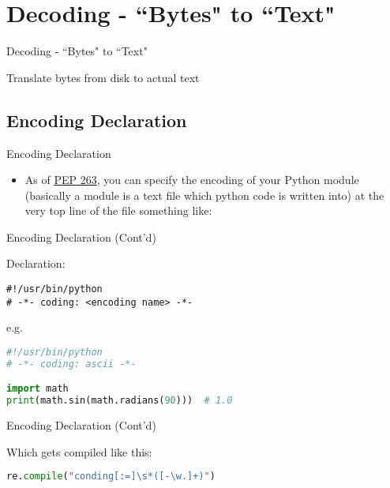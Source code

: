 \section{Decoding - ``Bytes" to ``Text"}
\begin{frame}{Decoding - ``Bytes" to ``Text"}
\begin{itemize}
{\LARGE \item[-] Translate bytes from disk to actual text}
\end{itemize}
\end{frame}

\subsection{Encoding Declaration}
\begin{frame}{Encoding Declaration}
\begin{itemize}
\item[-] As of \href{https://peps.python.org/pep-0263/}{PEP 263}, you can specify the encoding of your Python module (basically a module is a text
file which python code is written into) at the very top line of the file something like:
\end{itemize}
\end{frame}

\begin{frame}[fragile]{Encoding Declaration (Cont'd)}

\begin{flushleft}
Declaration:
\begin{lstlisting}
#!/usr/bin/python
# -*- coding: <encoding name> -*-
\end{lstlisting}
\end{flushleft}

\begin{flushleft}
e.g.
\begin{lstlisting}[language=python, keywordstyle=\color{Mulberry}\textbf]
#!/usr/bin/python
# -*- coding: ascii -*-

import math
print(math.sin(math.radians(90)))  # 1.0
\end{lstlisting}
\end{flushleft}
\end{frame}

\begin{frame}[fragile]{Encoding Declaration (Cont'd)}
\begin{flushleft}
Which gets compiled like this:
\begin{lstlisting}[language=python]
re.compile("conding[:=]\s*([-\w.]+)")
\end{lstlisting}
\end{flushleft}
\end{frame}

